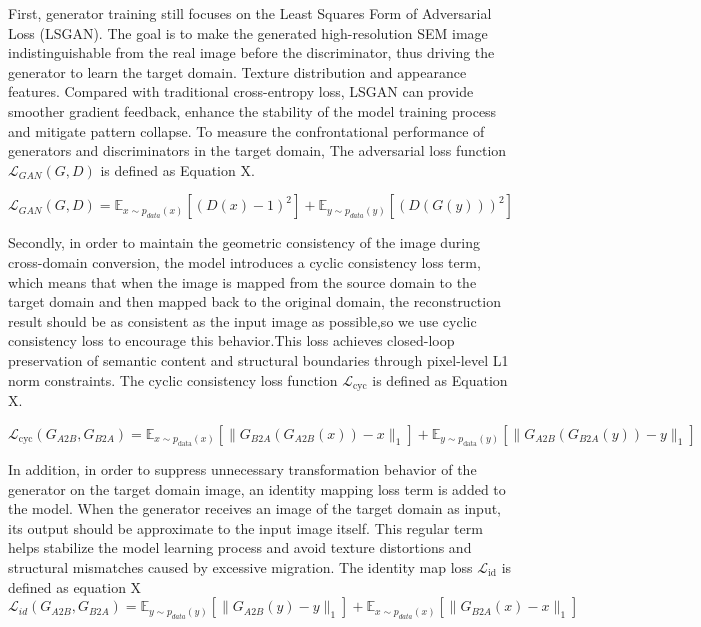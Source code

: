 \documentclass[a4paper,fleqn]{cas-sc}
\begin{document}
First, generator training still focuses on the Least Squares Form of Adversarial Loss (LSGAN). The goal is to make the generated high-resolution SEM image indistinguishable from the real image before the discriminator, thus driving the generator to learn the target domain. Texture distribution and appearance features. Compared with traditional cross-entropy loss, LSGAN can provide smoother gradient feedback, enhance the stability of the model training process and mitigate pattern collapse. To measure the confrontational performance of generators and discriminators in the target domain, The adversarial loss function $\mathcal{L}_{GAN}(G,D) $ is defined as Equation X. 
 
 \begin{equation}
\mathcal{L}_{GAN}(G, D) = \mathbb{E}_{x \sim p_{data}(x)}[(D(x) - 1)^2] + \mathbb{E}_{y \sim p_{data}(y)}[(D(G(y)))^2]
 \end{equation}



Secondly, in order to maintain the geometric consistency of the image during cross-domain conversion, the model introduces a cyclic consistency loss term, which means that when the image is mapped from the source domain to the target domain and then mapped back to the original domain, the reconstruction result should be as consistent as the input image as possible,so we use cyclic consistency loss to encourage this behavior.This loss achieves closed-loop preservation of semantic content and structural boundaries through pixel-level L1 norm constraints. The cyclic consistency loss function $\mathcal{L}_{\text{cyc}}$ is defined as Equation X. 

\begin{equation}
	\mathcal{L}_{\text{cyc}}(G_{A2B}, G_{B2A}) = \mathbb{E}_{x \sim p_{\text{data}}(x)} \left[ \| G_{B2A}(G_{A2B}(x)) - x \|_1 \right] + \mathbb{E}_{y \sim p_{\text{data}}(y)} \left[ \| G_{A2B}(G_{B2A}(y)) - y \|_1 \right]
\end{equation}


In addition, in order to suppress unnecessary transformation behavior of the generator on the target domain image, an identity mapping loss term is added to the model. When the generator receives an image of the target domain as input, its output should be approximate to the input image itself. This regular term helps stabilize the model learning process and avoid texture distortions and structural mismatches caused by excessive migration. The identity map loss $\mathcal{L}_{\text{id}}$ is defined as equation X 
\begin{equation}
	\mathcal{L}_{id}(G_{A2B}, G_{B2A}) = \mathbb{E}_{y \sim p_{data}(y)} \left[ \| G_{A2B}(y) - y \|_1 \right] + \mathbb{E}_{x \sim p_{data}(x)} \left[ \| G_{B2A}(x) - x \|_1 \right]
\end{equation}
\end{document}
